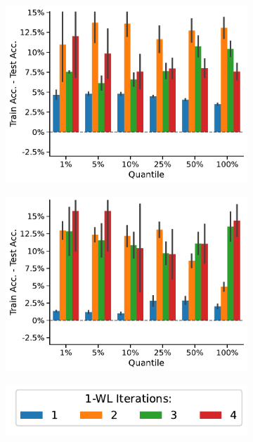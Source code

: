 \begin{figure}[!htb]
	\hfill
	\begin{subfigure}[b]{0.3\textwidth}
		\centering
		\includegraphics[width=\textwidth]{Figures/train_test_diff_k_wl_PROTEINS.pdf}
		\vspace*{-4ex} 
		\caption{\proteins}
	\end{subfigure}
	\hfill
	\begin{subfigure}[b]{0.3\textwidth}
		\centering
		\includegraphics[width=\textwidth]{Figures/train_test_diff_k_wl_REDDIT-BINARY.pdf}
		\vspace*{-4ex} 
		\caption{\reddit}
	\end{subfigure}
	\begin{subfigure}[b]{0.3\textwidth}
		\centering
		\includegraphics[width=\textwidth]{Figures/train_test_diff_k_wl_legend.pdf}

\end{subfigure}
\end{figure}
